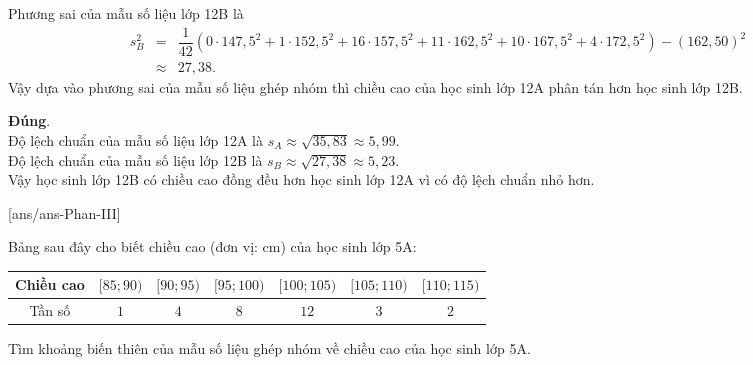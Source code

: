 \begin{ex}
{\begin{itemchoice}
 Phương sai của mẫu số liệu lớp 12B là
 \begin{eqnarray*}
 s_B^2&=&\dfrac{1}{42} \left(0\cdot 147{,}5^2+1\cdot 152{,}5^2+16\cdot 157{,}5^2+11\cdot 162{,}5^2+10\cdot 167{,}5^2+4\cdot 172{,}5^2\right)-\left(162{,}50\right)^2\\&\approx& 27{,}38.
 \end{eqnarray*}
 Vậy dựa vào phương sai của mẫu số liệu ghép nhóm thì chiều cao của học sinh lớp 12A phân tán hơn học sinh lớp 12B.
 
 \itemch \textbf{Đúng}. 
 \\Độ lệch chuẩn của mẫu số liệu lớp 12A là $s_A \approx \sqrt{35{,}83} \approx 5{,}99$.\\
 Độ lệch chuẩn của mẫu số liệu lớp 12B là $s_B \approx \sqrt{27{,}38} \approx 5{,}23$.\\
 Vậy học sinh lớp 12B có chiều cao đồng đều hơn học sinh lớp 12A vì có độ lệch chuẩn nhỏ hơn.
 \end{itemchoice}
 }
\end{ex}

\caukq
{}[ans/ans\currfilebase-Phan-III]
\begin{ex}%
 Bảng sau đây cho biết chiều cao (đơn vị: cm) của học sinh lớp 5A:
 \begin{center}
 \begin{tabular}{|c|c|c|c|c|c|c|}
 \hline
 Chiều cao & $[85; 90)$ & $[90; 95)$ & $[95; 100)$ & $[100; 105)$ & $[105; 110)$& $[110; 115)$\\
 \hline Tần số & $1$ & $4$ & $8$ & $12$ & $3$ & $2$ \\ \hline
 \end{tabular}
 \end{center}
 Tìm khoảng biến thiên của mẫu số liệu ghép nhóm về chiều cao của học sinh lớp 5A.
 
\end{ex}

